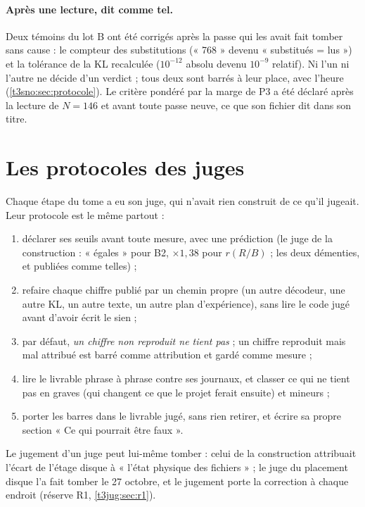 \paragraph{Après une lecture, dit comme tel.} Deux témoins du lot B ont été corrigés après la passe qui les avait fait tomber sans cause : le compteur des substitutions (« 768 » devenu « substitués = lus ») et la tolérance de la KL recalculée ($10^{-12}$ absolu devenu $10^{-9}$ relatif). Ni l'un ni l'autre ne décide d'un verdict ; tous deux sont barrés à leur place, avec l'heure (\cref{t3sno:sec:protocole}). Le critère pondéré par la marge de P3 a été déclaré après la lecture de $N = 146$ et avant toute passe neuve, ce que son fichier dit dans son titre.

\section{Les protocoles des juges}\label{t3ann:sec:juges}

Chaque étape du tome a eu son juge, qui n'avait rien construit de ce qu'il jugeait. Leur protocole est le même partout :
\begin{enumerate}
\item déclarer ses seuils avant toute mesure, avec une prédiction (le juge de la construction : « égales » pour B2, $\times 1{,}38$ pour $r(R/B)$ ; les deux démenties, et publiées comme telles) ;
\item refaire chaque chiffre publié par un chemin propre (un autre décodeur, une autre KL, un autre texte, un autre plan d'expérience), sans lire le code jugé avant d'avoir écrit le sien ;
\item par défaut, \emph{un chiffre non reproduit ne tient pas} ; un chiffre reproduit mais mal attribué est barré comme attribution et gardé comme mesure ;
\item lire le livrable phrase à phrase contre ses journaux, et classer ce qui ne tient pas en graves (qui changent ce que le projet ferait ensuite) et mineurs ;
\item porter les barres dans le livrable jugé, sans rien retirer, et écrire sa propre section « Ce qui pourrait être faux ».
\end{enumerate}
Le jugement d'un juge peut lui-même tomber : celui de la construction attribuait l'écart de l'étage disque à « l'état physique des fichiers » ; le juge du placement disque l'a fait tomber le 27 octobre, et le jugement porte la correction à chaque endroit (réserve R1, \cref{t3jug:sec:r1}).

